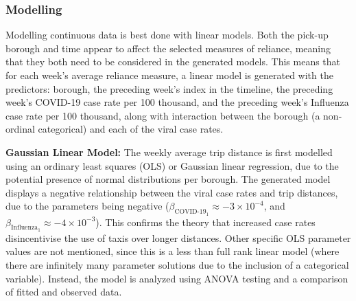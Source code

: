 \documentclass[11pt]{article}
\begin{document}

\subsubsection{Modelling}

Modelling continuous data is best done with linear models.
Both the pick-up borough and time appear to affect the selected measures of reliance,
meaning that they both need to be considered in the generated models.
This means that for each week's average reliance measure, 
a linear model is generated with the predictors: 
borough,
the preceding week's index in the timeline,
the preceding week's COVID-19 case rate per 100 thousand,
and
the preceding week's Influenza case rate per 100 thousand,
along with interaction between the borough (a non-ordinal categorical)
and each of the viral case rates.

\textbf{Gaussian Linear Model:}
The weekly average trip distance is first modelled using an ordinary least squares (OLS) or Gaussian linear regression,
due to the potential presence of normal distributions per borough.
The generated model displays a negative relationship 
between the viral case rates and trip distances,
due to the parameters being negative ($\beta_{\text{COVID-19}_1} \approx -3 \times 10^{-4}$, and $\beta_{\text{Influenza}_1} \approx -4 \times 10^{-3}$). 
This confirms the theory that increased case rates disincentivise the use of taxis over longer distances.
Other specific OLS parameter values are not mentioned, since this is a less than full rank linear model 
(where there are infinitely many parameter solutions due to the inclusion of a categorical variable).
Instead, the model is analyzed using ANOVA testing and a comparison of fitted and observed data.
\end{document}
